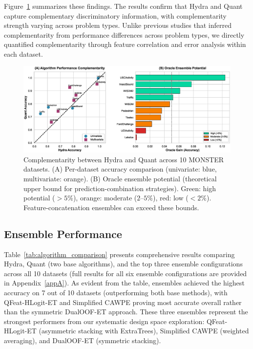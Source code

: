 \documentclass[pdflatex,sn-basic]{sn-jnl}           %
\theoremstyle{thmstyleone}%
\theoremstyle{thmstyletwo}%
\theoremstyle{thmstylethree}%
\begin{document}
Figure~\ref{fig:complementarity} summarizes these findings. The results confirm that Hydra and Quant capture complementary discriminatory information, with complementarity strength varying across problem types. Unlike previous studies that inferred complementarity from performance differences across problem types, we directly quantified complementarity through feature correlation and error analysis within each dataset.

\begin{figure}[t]
\centering
\includegraphics[width=\textwidth]{figure1_complementarity}
\caption{Complementarity between Hydra and Quant across 10 MONSTER datasets. (A) Per-dataset accuracy comparison (univariate: blue, multivariate: orange). (B) Oracle ensemble potential (theoretical upper bound for prediction-combination strategies). Green: high potential ($>5\%$), orange: moderate ($2$--$5\%$), red: low ($<2\%$). Feature-concatenation ensembles can exceed these bounds.}\label{fig:complementarity}
\end{figure}

\subsection{Ensemble Performance}

Table~\ref{tab:algorithm_comparison} presents comprehensive results comparing Hydra, Quant (two base algorithms), and the top three ensemble configurations across all 10 datasets (full results for all six ensemble configurations are provided in Appendix~\ref{appA}). As evident from the table, ensembles achieved the highest accuracy on 7 out of 10 datasets (outperforming both base methods), with QFeat-HLogit-ET and Simplified CAWPE proving most accurate overall rather than the symmetric DualOOF-ET approach. These three ensembles represent the strongest performers from our systematic design space exploration: QFeat-HLogit-ET (asymmetric stacking with ExtraTrees), Simplified CAWPE (weighted averaging), and DualOOF-ET (symmetric stacking).
\end{document}

